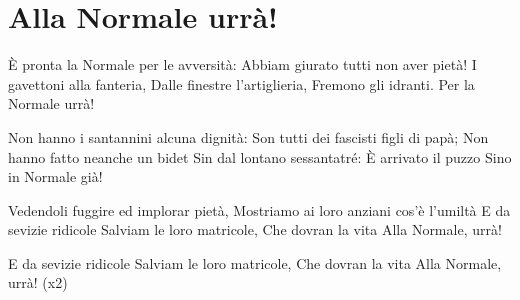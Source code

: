 \section{Alla Normale urrà!}
\subtitle{Sulla melodia di “When Johnny comes marching home”}
\begin{canzone}
È pronta la Normale per le avversità:
Abbiam giurato tutti non aver pietà!
I gavettoni alla fanteria,
Dalle finestre l’artiglieria,
Fremono gli idranti.
Per la Normale urrà!

Non hanno i santannini alcuna dignità:
Son tutti dei fascisti figli di papà;
Non hanno fatto neanche un bidet
Sin dal lontano sessantatré:
È arrivato il puzzo
Sino in Normale già!

Vedendoli fuggire ed implorar pietà,
Mostriamo ai loro anziani cos’è l’umiltà
E da sevizie ridicole
Salviam le loro matricole,
Che dovran la vita
Alla Normale, urrà! 

E da sevizie ridicole
Salviam le loro matricole,
Che dovran la vita
Alla Normale, urrà! (x2)
\end{canzone}
